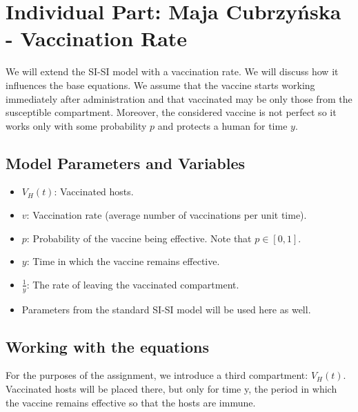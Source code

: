 \newpage
\section{Individual Part: Maja Cubrzyńska - Vaccination Rate}
We will extend the SI-SI model with a vaccination rate. We will discuss how it influences the base equations. We assume that the vaccine starts working immediately after administration and that vaccinated may be only those from the susceptible compartment. Moreover, the considered vaccine is not perfect so it works only with some probability $p$ and protects a human for time $y$. 
\subsection*{Model Parameters and Variables}
\begin{itemize}
    \item $V_H(t)$: Vaccinated hosts.
    \item $v$: Vaccination rate (average number of vaccinations per unit time).
    \item $p$: Probability of the vaccine being effective. Note that $p \in [0,1]$.
    \item $y$: Time in which the vaccine remains effective.
    \item $\frac{1}{y}$: The rate of leaving the vaccinated compartment.
    \item Parameters from the standard SI-SI model will be used here as well.
\end{itemize}
\subsection*{Working with the equations}
For the purposes of the assignment, we introduce a third compartment: $V_H(t)$. Vaccinated hosts will be placed there, but only for time y, the period in which the vaccine remains effective so that the hosts are immune.

